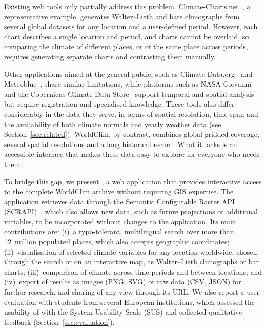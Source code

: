 
Existing web tools only partially address this problem. 
Climate-Charts.net~\cite{zepner2021climatecharts}, a representative example, generates 
Walter--Lieth and bars climographs from several global datasets for any location and a 
user-defined period. However, each chart describes a single location and period, and charts 
cannot be overlaid, so comparing the climate of different places, or of the same place across 
periods, requires generating separate charts and contrasting them manually.

Other applications aimed at the general public, such as Climate-Data.org~\cite{climatedataorg}
and Meteoblue~\cite{meteoblue}, share similar limitations, while platforms such as
NASA Giovanni~\cite{acker2022using} and the Copernicus Climate Data Store~\cite{buontempo2022copernicus}
support temporal and spatial analysis but require registration and specialised knowledge.
These tools also differ considerably in the data they serve, in terms of spatial
resolution, time span and the availability of both climate normals and yearly weather
data (see Section~\ref{sec:related}). WorldClim, by contrast, combines global gridded
coverage, several spatial resolutions and a long historical record. What it lacks is
an accessible interface that makes these data easy to explore for everyone who needs them.

To bridge this gap, we present \webappname{}, a web application that provides
interactive access to the complete WorldClim archive without requiring GIS expertise.
The application retrieves data through the Semantic Configurable Raster API
(SCRAPI)~\cite{scrapi}, which also allows new data, such as future projections or
additional variables, to be incorporated without changes to the application.
Its main contributions are:
(i)~a typo-tolerant, multilingual search over more than 12~million populated places,
which also accepts geographic coordinates;
(ii)~visualisation of selected climate variables for any location worldwide, chosen
through the search or on an interactive map, as Walter--Lieth climographs or bar charts;
(iii)~comparison of climate across time periods and between locations; and
(iv)~export of results as images (PNG, SVG) or raw data (CSV, JSON) for further
research, and sharing of any view through its URL.
We also report a user evaluation with students from several European institutions,
which assessed the usability of \webappname{} with the System Usability Scale (SUS)
and collected qualitative feedback (Section~\ref{sec:evaluation}).

